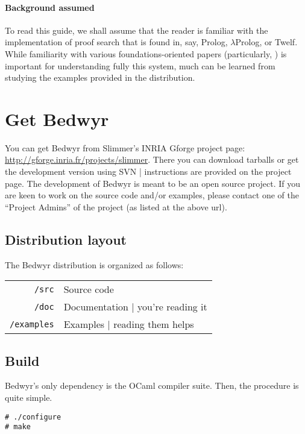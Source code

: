 \documentclass{article}
\newcommand{\lp}{$\lambda$Prolog}
\begin{document}
\paragraph{Background assumed}
To read this guide, we shall assume that the reader is familiar with
the implementation of proof search that is found in, say, Prolog, \lp,
or Twelf.  While familiarity with various foundations-oriented papers
(particularly, \cite{mcdowell03tcs, miller05tocl,tiu04phd}) is
important for understanding fully this system, much can be learned
from studying the examples provided in the distribution.

\section{Get Bedwyr}
\label{sec:install}

You can get Bedwyr from Slimmer's INRIA Gforge project page:
\url{http://gforge.inria.fr/projects/slimmer}.
There you can download tarballs or get the development version using SVN
| instructions are provided on the project page.  The development of
Bedwyr is meant to be an open source project.  If you are keen
to work on the source code and/or examples, please contact
one of the ``Project Admins'' of the project (as listed at the above url).

\subsection{Distribution layout}

The Bedwyr distribution is organized as follows:

\begin{tabular}{r@{\quad}l}
  \texttt{/src}      & Source code \\
  \texttt{/doc}      &  Documentation | you're reading it \\
  \texttt{/examples} &  Examples | reading them helps
\end{tabular}

\subsection{Build}

Bedwyr's only dependency is the OCaml compiler suite.
Then, the procedure is quite simple.

\begin{verbatim}
# ./configure
# make
\end{verbatim}
\end{document}
